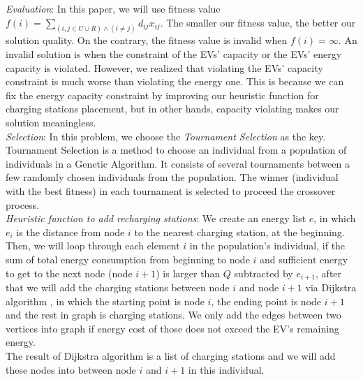 \documentclass[conference,compsoc]{IEEEtran}
\begin{document}
\textit{Evaluation}: In this paper, we will use fitness value $f(i) = \sum_{\left(i, j \in U \cup R\right) \land \left(i \neq j \right)}{d_{ij}x_{ij}}$. The smaller our fitness value, the better our solution quality. On the contrary, the fitness value is invalid when $f(i) = \infty$. An invalid solution is when the constraint of the EVs' capacity or the EVs' energy capacity is violated. However, we realized that violating the EVs' capacity constraint is much worse than violating the energy one. This is because we can fix the energy capacity constraint by improving our heuristic function for charging stations placement, but in other hands, capacity violating makes our solution meaningless.\\


\textit{Selection}: In this problem, we choose the \textit{Tournament Selection} \cite{tournament-selection} as the key. Tournament Selection is a method to choose an individual from a population of individuals in a Genetic Algorithm. It consists of several tournaments between a few randomly chosen individuals from the population. The winner (individual with the best fitness) in each tournament is selected to proceed the crossover process. \\

\textit{Heuristic function to add recharging stations}: We create an energy list $e$, in which $e_i$ is the distance from node $i$ to the nearest charging station, at the beginning. Then, we will loop through each element $i$ in the population's individual, if the sum of total energy consumption from beginning to node $i$ and sufficient energy to get to the next node (node $i + 1$) is larger than $Q$ subtracted by $e_{i + 1}$, after that we will add the charging stations between node $i$ and node $i + 1$ via Dijkstra algorithm \cite{dijkstra}, in which the starting point is node $i$, the ending point is node $i + 1$ and the rest in graph is charging stations. We only add the edges between two vertices into graph if energy cost of those does not exceed the EV's remaining energy.\\
The result of Dijkstra algorithm is a list of charging stations and we will add these nodes into between node $i$ and $i+1$ in this individual.\\
\end{document}
